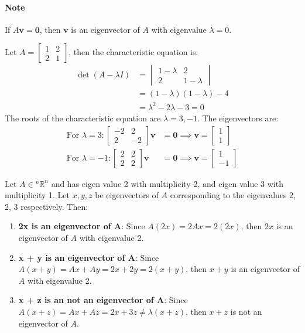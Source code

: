 \documentclass[11pt]{report}
\begin{document}
\paragraph{Note} If $A\textbf{v} = \textbf{0}$, then $\textbf{v}$ is an eigenvector of $A$ with eigenvalue $\lambda = 0$.
\begin{example}
    Let $A = \begin{bmatrix} 1 & 2 \\ 2 & 1 \end{bmatrix}$, then the characteristic equation is:
    \begin{align*}
        \det(A - \lambda I) &= \begin{vmatrix} 1-\lambda & 2 \\ 2 & 1-\lambda \end{vmatrix} \\
        &= (1-\lambda)(1-\lambda) - 4 \\
        &= \lambda^2 - 2\lambda - 3 = 0
    \end{align*}
    The roots of the characteristic equation are $\lambda = 3, -1$. The eigenvectors are:
    \begin{align*}
        \text{For } \lambda = 3: \begin{bmatrix} -2 & 2 \\ 2 & -2 \end{bmatrix}\textbf{v} &= \textbf{0} \implies \textbf{v} = \begin{bmatrix} 1 \\ 1 \end{bmatrix} \\
        \text{For } \lambda = -1: \begin{bmatrix} 2 & 2 \\ 2 & 2 \end{bmatrix}\textbf{v} &= \textbf{0} \implies \textbf{v} = \begin{bmatrix} 1 \\ -1 \end{bmatrix}
    \end{align*}
\end{example}
\begin{example}
    Let $A \in {^n\mathbb{R}^n}$ and has eigen value 2 with multiplicity 2, and eigen value 3 with multiplicity 1. Let $x, y, z$ be eigenvectors of $A$ corresponding to the eigenvalues 2, 2, 3 respectively. Then:
    \begin{enumerate}
        \item \textbf{2x is an eigenvector of A}: Since $A(2x) = 2Ax = 2(2x)$, then $2x$ is an eigenvector of $A$ with eigenvalue 2.
        \item \textbf{x + y is an eigenvector of A}: Since $A(x + y) = Ax + Ay = 2x + 2y = 2(x + y)$, then $x + y$ is an eigenvector of $A$ with eigenvalue 2.
        \item \textbf{x + z is an not an eigenvector of A}: Since $A(x + z) = Ax + Az = 2x + 3z \neq \lambda(x + z)$, then $x + z$ is not an eigenvector of $A$.
    \end{enumerate}
\end{example}
\end{document}
